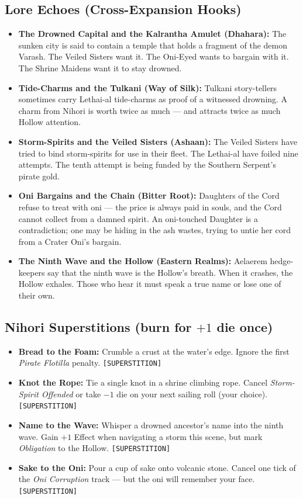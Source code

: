 \subsection*{Lore Echoes (Cross-Expansion Hooks)}
\begin{itemize}
  \item \textbf{The Drowned Capital and the Kalrantha Amulet (Dhahara):} The sunken city is said to contain a temple that holds a fragment of the demon Varash. The Veiled Sisters want it. The Oni-Eyed wants to bargain with it. The Shrine Maidens want it to stay drowned.
  \item \textbf{Tide-Charms and the Tulkani (Way of Silk):} Tulkani story-tellers sometimes carry Lethai-al tide-charms as proof of a witnessed drowning. A charm from Nihori is worth twice as much --- and attracts twice as much Hollow attention.
  \item \textbf{Storm-Spirits and the Veiled Sisters (Ashaan):} The Veiled Sisters have tried to bind storm-spirits for use in their fleet. The Lethai-al have foiled nine attempts. The tenth attempt is being funded by the Southern Serpent's pirate gold.
  \item \textbf{Oni Bargains and the Chain (Bitter Root):} Daughters of the Cord refuse to treat with oni --- the price is always paid in souls, and the Cord cannot collect from a damned spirit. An oni-touched Daughter is a contradiction; one may be hiding in the ash wastes, trying to untie her cord from a Crater Oni's bargain.
  \item \textbf{The Ninth Wave and the Hollow (Eastern Realms):} Aelaerem hedge-keepers say that the ninth wave is the Hollow's breath. When it crashes, the Hollow exhales. Those who hear it must speak a true name or lose one of their own.
\end{itemize}

\subsection*{Nihori Superstitions (burn for $+1$ die once)}
\begin{itemize}
  \item \textbf{Bread to the Foam:} Crumble a crust at the water's edge. Ignore the first \emph{Pirate Flotilla} penalty. \texttt{[SUPERSTITION]}
  \item \textbf{Knot the Rope:} Tie a single knot in a shrine climbing rope. Cancel \emph{Storm-Spirit Offended} or take $-1$ die on your next sailing roll (your choice). \texttt{[SUPERSTITION]}
  \item \textbf{Name to the Wave:} Whisper a drowned ancestor's name into the ninth wave. Gain $+1$ Effect when navigating a storm this scene, but mark \emph{Obligation} to the Hollow. \texttt{[SUPERSTITION]}
  \item \textbf{Sake to the Oni:} Pour a cup of sake onto volcanic stone. Cancel one tick of the \emph{Oni Corruption} track --- but the oni will remember your face. \texttt{[SUPERSTITION]}
\end{itemize}

